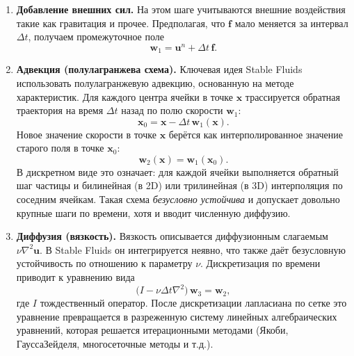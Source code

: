 \begin{enumerate}
      \item \textbf{Добавление внешних сил.}
            На этом шаге учитываются внешние воздействия такие как гравитация и прочее.
            Предполагая, что $\mathbf{f}$ мало меняется за интервал $\Delta t$, получаем
            промежуточное поле
            \begin{equation}
                  \mathbf{w}_1
                  =
                  \mathbf{u}^n + \Delta t\,\mathbf{f}.
            \end{equation}

      \item \textbf{Адвекция (полулагранжева схема).}
            Ключевая идея Stable Fluids \textemdash{} использовать полулагранжевую
            адвекцию, основанную на методе характеристик. Для каждого
            центра ячейки в точке $\mathbf{x}$ трассируется обратная
            траектория на время $\Delta t$ назад по полю скорости
            $\mathbf{w}_1$:
            \begin{equation}
                  \mathbf{x}_0
                  =
                  \mathbf{x}
                  - \Delta t\,\mathbf{w}_1(\mathbf{x}).
            \end{equation}
            Новое значение скорости в точке $\mathbf{x}$ берётся как
            интерполированное значение старого поля в точке $\mathbf{x}_0$:
            \begin{equation}
                  \mathbf{w}_2(\mathbf{x})
                  =
                  \mathbf{w}_1(\mathbf{x}_0).
            \end{equation}
            В дискретном виде это означает: для каждой ячейки выполняется
            обратный шаг частицы и билинейная (в 2D) или трилинейная (в
            3D) интерполяция по соседним ячейкам. Такая схема
            \emph{безусловно устойчива} и допускает довольно крупные шаги
            по времени, хотя и вводит численную диффузию.

      \item \textbf{Диффузия (вязкость).}
            Вязкость описывается диффузионным слагаемым
            $\nu\nabla^2 \mathbf{u}$. В Stable Fluids он интегрируется
            неявно, что также даёт безусловную устойчивость по
            отношению к параметру $\nu$. Дискретизация по времени приводит
            к уравнению вида
            \[
                  \bigl(I - \nu \Delta t \nabla^2\bigr)\,\mathbf{w}_3
                  =
                  \mathbf{w}_2,
            \]
            где $I$ \textemdash{} тождественный оператор. После дискретизации
            лапласиана по сетке это уравнение превращается в разреженную
            систему линейных алгебраических уравнений, которая решается
            итерационными методами (Якоби, Гаусса\textemdash{}Зейделя, многосеточные
            методы и т.д.).


\end{enumerate}
